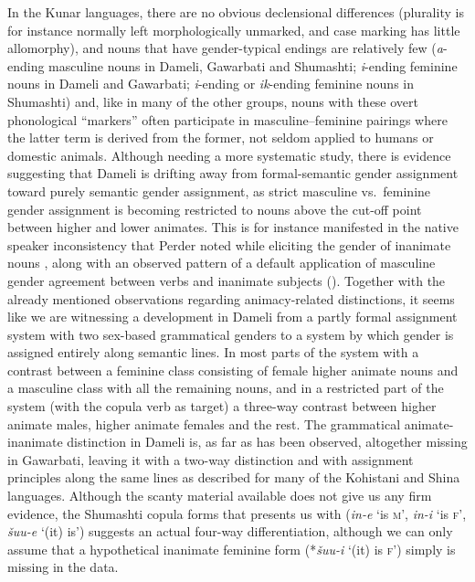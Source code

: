 \documentclass[output=collectionpaper]{langsci/langscibook}
\begin{document}
In the Kunar languages, there are no obvious declensional differences (plurality is for instance normally left morphologically unmarked, and case marking has little allomorphy), and nouns that have gender-typical endings are relatively few (\textit{a}{}-ending masculine nouns in Dameli, Gawarbati and Shumashti; \textit{i}{}-ending feminine nouns in Dameli and Gawarbati; \textit{i}{}-ending or \textit{ik}{}-ending feminine nouns in Shumashti) and, like in many of the other groups, nouns with these overt phonological ``markers'' often participate in masculine--feminine pairings where the latter term is derived from the former, not seldom applied to humans or domestic animals. Although needing a more systematic study, there is evidence suggesting that Dameli is drifting away from formal-semantic gender assignment toward purely semantic gender assignment, as strict masculine vs.\ feminine gender assignment is becoming restricted to nouns above the cut-off point between higher and lower animates. This is for instance manifested in the native speaker inconsistency that Perder noted while eliciting the gender of inanimate nouns \citep[54]{Perder2013}, along with an observed pattern of a default application of masculine gender agreement between verbs and inanimate subjects (\citealt*[111]{Perder2013}). Together with the already mentioned observations regarding animacy-related distinctions, it seems like we are witnessing a development in Dameli from a partly formal assignment system with two sex-based grammatical genders to a system by which gender is assigned entirely along semantic lines. In most parts of the system with a contrast between a feminine class consisting of female higher animate nouns and a masculine class with all the remaining nouns, and in a restricted part of the system (with the copula verb as target) a three-way contrast between higher animate males, higher animate females and the rest. The grammatical animate-inanimate distinction in Dameli is, as far as has been observed, altogether missing in Gawarbati, leaving it with a two-way distinction and with assignment principles along the same lines as described for many of the Kohistani and Shina languages. Although the scanty material available does not give us any firm evidence, the Shumashti copula forms that \citet[255]{Morgenstierne1945} presents us with (\textit{in-e} `is \textsc{m}', \textit{in-i} `is \textsc{f}', \textit{šuu-e} `(it) is') suggests an actual four-way differentiation, although we can only assume that a hypothetical inanimate feminine form (*\textit{šuu-i} `(it) is \textsc{f}') simply is missing in the data.
\end{document}
